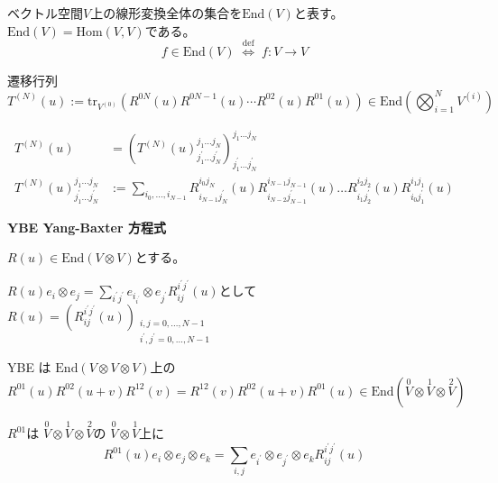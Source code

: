 \documentclass[12pt,a4paper]{ltjsarticle}
\begin{document}
\hrulefill

ベクトル空間$V$上の線形変換全体の集合を$\mathrm{End}(V)$と表す。
$\mathrm{End}(V) = \mathrm{Hom}(V,V)$である。
\begin{equation}
  f \in \mathrm{End}(V)
  \; \overset{\mathrm{def}}{\Longleftrightarrow}\;
  f:V\to V
\end{equation}

\dotfill

遷移行列
\begin{equation}
 T^{(N)}(u) := \mathrm{tr}_{V^{(0)}}\left( R^{0N}(u)R^{0N-1}(u) \cdots R^{02}(u)R^{01}(u) \right)
  \in \mathrm{End} \left( \bigotimes_{i=1}^{N} V^{(i)} \right)
\end{equation}

\begin{align}
 T^{(N)}(u) &= \left( T^{(N)}(u)^{j_{1}\dots j_{N}}_{j_{1}^{\prime}\dots j_{N}^{\prime}} \right)^{j_{1}\dots j_{N}}_{j_{1}^{\prime}\dots j_{N}^{\prime}}
  \\
  T^{(N)}(u)^{j_{1}\dots j_{N}}_{j_{1}^{\prime}\dots j_{N}^{\prime}}
  &:=
  \sum_{i_{0},\dots ,i_{N-1}}
  R^{i_{0}j_{N}}_{i_{N-1}j^{\prime}_{N}}(u)
   R^{i_{N-1}j_{N-1}}_{i_{N-2}j^{\prime}_{N-1}}(u)
   \dots
   R^{i_{2}j_{2}}_{i_{1}j^{\prime}_{2}}(u)
   R^{i_{1}j_{1}}_{i_{0}j^{\prime}_{1}}(u)
\end{align}


\dotfill

\textbf{YBE Yang-Baxter 方程式}

$R(u)\in \mathrm{End}(V\otimes V)$とする。

$R(u) e_{i}\otimes e_{j} = \sum_{i^{\prime}j^{\prime}} e_{i_{i^{\prime}}}\otimes e_{j^{\prime}} R^{i^{\prime}j^{\prime}}_{ij}(u)$として
$R(u)=\left( R^{i^{\prime}j^{\prime}}_{ij}(u) \right)_{\substack{i,j=0,\dots,N-1 \\ i^{\prime},j^{\prime}=0,\dots,N-1}}$

YBE は $\mathrm{End}(V\otimes V\otimes V)$上の
\begin{equation}
 R^{01}(u) R^{02}(u+v) R^{12}(v) = R^{12}(v) R^{02}(u+v) R^{01}(u) \in \mathrm{End}(\overset{0}{V} \otimes \overset{1}{V} \otimes \overset{2}{V})
\end{equation}

$R^{01}$は
$\overset{0}{V} \otimes \overset{1}{V} \otimes \overset{2}{V}$の
$\overset{0}{V} \otimes \overset{1}{V}$上に
\begin{equation}
 R^{01}(u) e_{i} \otimes e_{j} \otimes e_{k}
  = \sum_{i,j} e_{i^{\prime}} \otimes e_{j^{\prime}} \otimes e_{k}
  R^{i^{\prime}j^{\prime}}_{ij}(u)
\end{equation}
\end{document}
